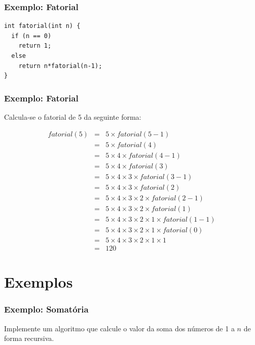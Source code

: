 \documentclass[aspectratio=169]{beamer}
\begin{document}

\begin{frame}[fragile]
\frametitle{Exemplo: Fatorial}
\begin{lstlisting}
int fatorial(int n) {
  if (n == 0)
    return 1;
  else 
    return n*fatorial(n-1);  
}
\end{lstlisting}
\end{frame}


\begin{frame}[fragile]
\frametitle{Exemplo: Fatorial}
Calcula-se o fatorial de 5 da seguinte forma:

\begin{eqnarray}
 fatorial(5)&=& 5 \times fatorial(5-1) \nonumber \\
	    &=& 5 \times fatorial(4) \nonumber \\
	    &=& 5 \times 4 \times fatorial(4-1) \nonumber \\ 
	    &=& 5 \times 4 \times fatorial(3) \nonumber \\ 
	    &=& 5 \times 4 \times 3 \times fatorial(3-1) \nonumber \\
            &=& 5 \times 4 \times 3 \times fatorial(2) \nonumber \\
	    &=& 5 \times 4 \times 3 \times 2 \times fatorial(2-1) \nonumber \\
	    &=& 5 \times 4 \times 3 \times 2 \times fatorial(1) \nonumber \\
	    &=& 5 \times 4 \times 3 \times 2 \times 1 \times fatorial(1-1) \nonumber \\
	    &=& 5 \times 4 \times 3 \times 2 \times 1 \times fatorial(0) \nonumber \\	    
	    &=& 5 \times 4 \times 3 \times 2 \times 1 \times 1 \nonumber \\
	    &=& 120 \nonumber
\label{calculo_fatorial}	    
\end{eqnarray}
\end{frame}

\section{Exemplos}

\begin{frame}
\frametitle{Exemplo: Somatória}
Implemente um algoritmo que calcule o valor da soma dos números de 1 a $n$ de forma recursiva.
\end{frame}
\end{document}
